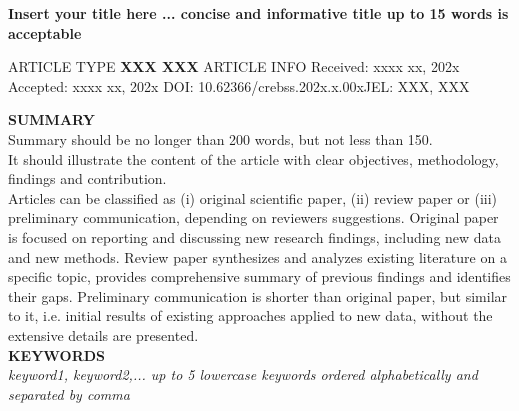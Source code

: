 \documentclass{crebsshr}
\renewcommand\doinumber{10.62366/crebss.202x.x.00x}
\renewcommand\JEL{XXX, XXX}
\begin{document}
\begin{center}
	\large  \bf Insert your title here ... {\color{red}concise and informative title up to 15 words is acceptable}
\end{center}

\begin{minipage}[b]{\dimexpr0.32\textwidth-1\fboxrule-0.5\fboxsep\relax}
	ARTICLE TYPE \newline
	\rm\small \textbf{XXX XXX} \newline \newline \newline
	ARTICLE INFO \newline
	Received: xxxx xx, 202x \newline Accepted: xxxx xx, 202x \newline DOI: \doinumber \newline JEL: \JEL  \newline \newline \newline
\end{minipage}%
\begin{minipage}[b]{0.68\textwidth}
	\vspace{0.2cm}  \textbf{SUMMARY} \\
		{\color{red} Summary should be no longer than 200 words, but not less than 150. \\ It should illustrate the content of the article with clear objectives, methodology, findings and contribution. \\ Articles can be classified as (i) original scientific paper, (ii) review paper or (iii) preliminary communication, depending on reviewers suggestions.} Original paper is focused on reporting and discussing new research findings, including new data and new methods. Review paper synthesizes and analyzes existing literature on a specific topic, provides comprehensive summary of previous findings and identifies their gaps. Preliminary communication is shorter than original paper, but similar to it, i.e. initial results of existing approaches applied to new data, without the extensive details are presented. \smallskip \\
	\textbf{KEYWORDS} \\ {\it keyword1, keyword2,... {\color{red}up to 5 lowercase keywords ordered alphabetically and separated by comma}}
	
\end{minipage} 
\end{document}

